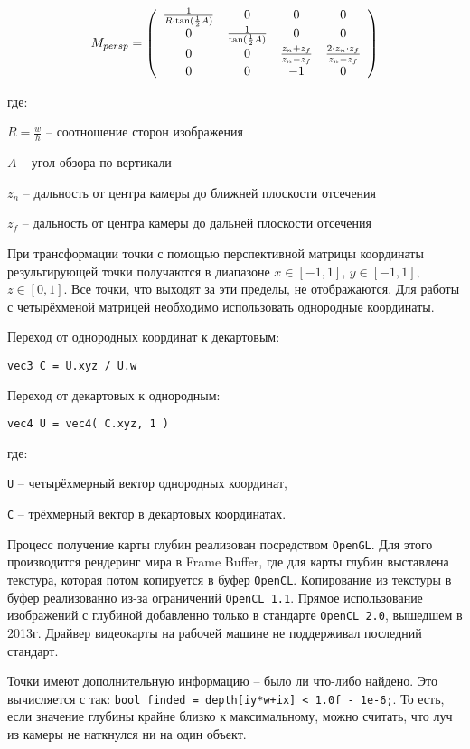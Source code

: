 $$
M_{persp} = \left( \begin{array}{c c c c}
        \frac{1}{ R \cdot \tan( \frac{1}{2} A ) } & 0 & 0 & 0 \\
        0 & \frac{1}{ \tan( \frac{1}{2} A ) } & 0 & 0 \\
        0 & 0 & \frac{ z_{n} + z_{f} }{ z_{n}-z_{f} } & \frac{ 2 \cdot z_{n} \cdot z_{f} }{ z_{n} - z_{f} } \\
        0 & 0 & -1 & 0
\end{array} \right)
$$

где:

$R = \frac{w}{h}$ -- соотношение сторон изображения

$A$ -- угол обзора по вертикали

$z_{n}$ -- дальность от центра камеры до ближней плоскости отсечения

$z_{f}$ -- дальность от центра камеры до дальней плоскости отсечения

При трансформации точки с помощью перспективной матрицы координаты результирующей точки
получаются в диапазоне $x \in [-1,1]$, $y \in [-1,1]$, $z \in [0,1]$. Все точки, что выходят
за эти пределы, не отображаются. Для работы с четырёхменой матрицей необходимо использовать
однородные координаты.

Переход от однородных координат к декартовым: 

\verb|vec3 C = U.xyz / U.w|

Переход от декартовых к однородным:

\verb|vec4 U = vec4( C.xyz, 1 )|

где:

\verb|U| -- четырёхмерный вектор однородных координат,

\verb|C| -- трёхмерный вектор в декартовых координатах.

Процесс получение карты глубин реализован посредством \verb|OpenGL|. Для этого 
производится рендеринг мира в Frame Buffer, где для карты глубин выставлена текстура, 
которая потом копируется в буфер \verb|OpenCL|. Копирование из текстуры в буфер реализованно
из-за ограничений \verb|OpenCL 1.1|. Прямое использование изображений с глубиной добавленно
только в стандарте \verb|OpenCL 2.0|, вышедшем в 2013г. Драйвер видеокарты на рабочей машине
не поддерживал последний стандарт.

Точки имеют дополнительную информацию -- было ли что-либо найдено.
Это вычисляется с так: \verb|bool finded = depth[iy*w+ix] < 1.0f - 1e-6;|.
То есть, если значение глубины крайне близко к максимальному, можно считать, что
луч из камеры не наткнулся ни на один объект.

